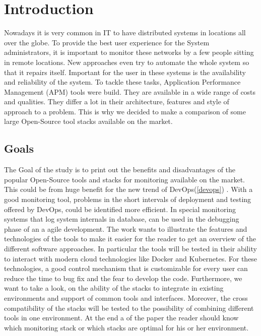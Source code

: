 
\chapter{Introduction}
Nowadays it is very common in IT to have distributed systems in locations all over the globe\cite{1687567}. To provide the best user experience for the System administrators, it is important to monitor these networks by a few people sitting in remote locations. New approaches even try to automate the whole system so that it repairs itself. Important for the user in these systems is the availability and reliability of the system. 
To tackle these tasks, Application Performance Management (APM) tools were build. They are available in a wide range of costs and qualities. They differ a lot in their architecture, features and style of approach to a problem. This is why we decided to make a comparison of some large Open-Source tool stacks available on the market. 
\section{Goals}
The Goal of the study is to print out the benefits and disadvantages of the popular Open-Source tools and stacks for monitoring available on the market. This could be from huge benefit for the new trend of DevOps(\cref{devops}) \cite{Bass:2015:DSA:2810087} . With a good monitoring tool, problems in the short intervals of deployment and testing offered by DevOps, could be identified more efficient. In special monitoring systems that log system internals in database, can be used in the debugging phase of an a agile development.  
The work wants to illustrate the features and technologies of the tools to make it easier for the reader to get an overview of the different software approaches. In particular the tools will be tested in their ability to interact with modern cloud technologies like Docker and Kubernetes.
For these technologies, a good control mechanism that is customizable for every user can reduce the time to bug fix and the fear to develop the code.
 Furthermore, we want to take a look, on the ability of the stacks to integrate in existing environments and support of common tools and interfaces. Moreover, the cross compatibility of the stacks will be tested to the possibility of combining different tools in one environment. At the end a of the paper the reader should know which monitoring stack or which stacks are optimal for his or her environment.  

